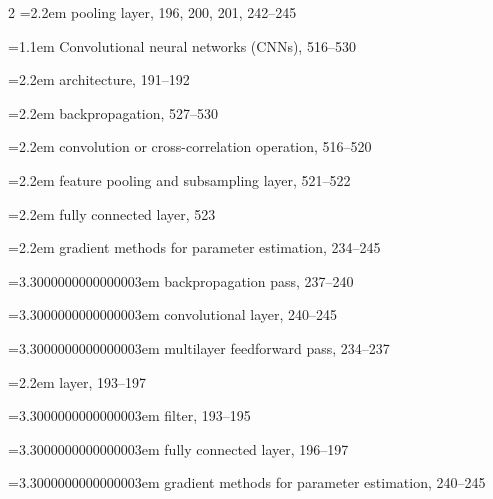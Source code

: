\begin{multicols}{2}
\noindent\hangindent=2.2em \hspace*{1.1em}pooling layer, 196, 200, 201, 242--245\par
\noindent\hangindent=1.1em Convolutional neural networks (CNNs), 516--530\par
\noindent\hangindent=2.2em \hspace*{1.1em}architecture, 191--192\par
\noindent\hangindent=2.2em \hspace*{1.1em}backpropagation, 527--530\par
\noindent\hangindent=2.2em \hspace*{1.1em}convolution or cross-correlation operation, 516--520\par
\noindent\hangindent=2.2em \hspace*{1.1em}feature pooling and subsampling layer, 521--522\par
\noindent\hangindent=2.2em \hspace*{1.1em}fully connected layer, 523\par
\noindent\hangindent=2.2em \hspace*{1.1em}gradient methods for parameter estimation, 234--245\par
\noindent\hangindent=3.3000000000000003em \hspace*{2.2em}backpropagation pass, 237--240\par
\noindent\hangindent=3.3000000000000003em \hspace*{2.2em}convolutional layer, 240--245\par
\noindent\hangindent=3.3000000000000003em \hspace*{2.2em}multilayer feedforward pass, 234--237\par
\noindent\hangindent=2.2em \hspace*{1.1em}layer, 193--197\par
\noindent\hangindent=3.3000000000000003em \hspace*{2.2em}filter, 193--195\par
\noindent\hangindent=3.3000000000000003em \hspace*{2.2em}fully connected layer, 196--197\par
\noindent\hangindent=3.3000000000000003em \hspace*{2.2em}gradient methods for parameter estimation, 240--245\par

\end{multicols}
